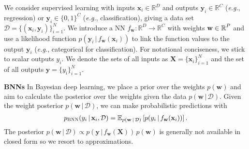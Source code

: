 \documentclass{article}
\makeatletter
\newcommand{\eg}{\textit{e.g.\@}\xspace}
\newcommand{\dataset}{\ensuremath{\mathcal{D}}}
\newcommand{\inputDomain}{\ensuremath{\mathbb{R}^{D}}}
\newcommand{\outputDomain}{\ensuremath{\mathbb{R}^{C}}}
\newcommand{\weights}{\ensuremath{\mathbf{w}}}
\newcommand{\mbf}[1]{\mathbf{#1}}
\renewcommand{\mid}{\,|\,}
\newcommand{\MX}{\mbf{X}}
\newcommand{\vx}{\mbf{x}}
\newcommand{\vy}{\mbf{y}}
\newcommand{\vw}{\mbf{w}}
\makeatother
\begin{document}

We consider supervised learning with inputs $\vx_i \in \inputDomain$ and outputs $\vy_i \in \outputDomain$ (\eg, regression) or $\vy_{i} \in \{0,1\}^{C}$ (\eg, classification),
giving a data set $\dataset = \{(\vx_{i} , \vy_{i})\}_{i=1}^{N}$.
We introduce a  NN $f_\mathbf{w}: \inputDomain \to \outputDomain$ with weights $\weights \in \R^{P}$ and use a likelihood function $p(\vy_{i} \mid f_\mathbf{w}(\vx_{i}))$
to link the function values to the output $\vy_{i}$ (\eg, categorical for classification).
For notational conciseness, we stick to scalar outputs $y_{i}$. We denote the sets of all inputs
as $\MX = \{\vx_{i}\}_{i=1}^{N}$ and the set of all outputs $\vy = \{y_{i}\}_{i=1}^{N}$.

\textbf{BNNs}
In Bayesian deep learning, we place a prior over the weights $p(\vw)$ and aim to calculate the posterior over the weights given the data $p(\vw \mid \mathcal{D})$.
Given the weight posterior $p(\vw \mid \mathcal{D})$, we can make probabilistic predictions with
\begin{align} \label{eq-predictions}
  p_{\text{\sc BNN}}(y_{i} \mid \vx_{i}, \mathcal{D}) = \E_{p(\vw \mid \mathcal{D})} \left[ p(y_{i} \mid f_{\vw}(\vx_{i})) \right].
\end{align}
The posterior ${p(\vw \mid \dataset) \propto p(\vy \mid f_{\weights}(\MX)) \, p(\weights)}$ is generally not available in closed form
so we resort to approximations.
\end{document}
